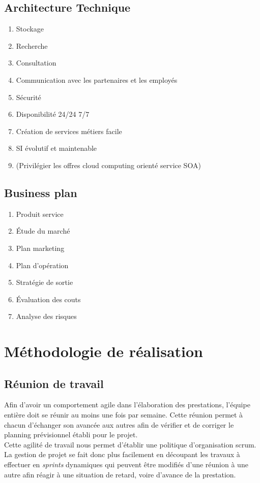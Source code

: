 \subsection{Architecture Technique}
\begin{enumerate}
  \item Stockage
  \item Recherche
  \item Consultation
  \item Communication avec les partenaires et les employés
  \item Sécurité
  \item Disponibilité 24/24 7/7
  \item Création de services métiers facile
  \item SI évolutif et maintenable
  \item (Privilégier les offres cloud computing orienté service SOA)
\end{enumerate}

\subsection{Business plan}
\begin{enumerate}
  \item Produit service
  \item Étude du marché
  \item Plan marketing
  \item Plan d'opération
  \item Stratégie de sortie
  \item Évaluation des couts
  \item Analyse des risques
\end{enumerate}

\section{Méthodologie de réalisation}
\subsection{Réunion de travail}
Afin d'avoir un comportement agile dans l'élaboration des prestations, l'équipe
entière doit se réunir au moins une fois par semaine. Cette réunion permet à
chacun d'échanger son avancée aux autres afin de vérifier et de corriger le
planning prévisionnel établi pour le projet. \\

Cette agilité de travail nous permet d'établir une politique d'organisation
scrum. La gestion de projet se fait donc plus facilement en découpant les
travaux à effectuer en \textit{sprints} dynamiques qui peuvent être modifiés
d'une réunion à une autre afin réagir à une situation de retard, voire d'avance
de la prestation. \\

